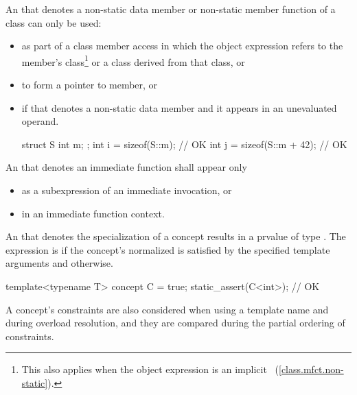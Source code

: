 \pnum
An  that denotes a non-static data member or
non-static member function of a class can only be used:
\begin{itemize}
\item as part of a class member access in which the
object expression
refers to the member's class\footnote{This also applies when the object expression
is an implicit ~(\ref{class.mfct.non-static}).} or a class derived from
that class, or

\item to form a pointer to member, or

\item if that  denotes a non-static data member
and it appears in an unevaluated operand.
\begin{example}
\begin{codeblock}
struct S {
  int m;
};
int i = sizeof(S::m);           // OK
int j = sizeof(S::m + 42);      // OK
\end{codeblock}
\end{example}
\end{itemize}

\pnum
An 
that denotes an immediate function
shall appear only
\begin{itemize}
\item as a subexpression of an immediate invocation, or
\item in an immediate function context.
\end{itemize}

\pnum
An 
that denotes the specialization of a concept
results in a prvalue of type .
The expression is  if
the concept's normalized
is satisfied
by the specified template arguments
and  otherwise.
\begin{example}
\begin{codeblock}
template<typename T> concept C = true;
static_assert(C<int>);          // OK
\end{codeblock}
\end{example}
\begin{note}
A concept's constraints are also considered
when using a template name
and during overload resolution,
and they are compared
during the partial ordering of constraints.
\end{note}


